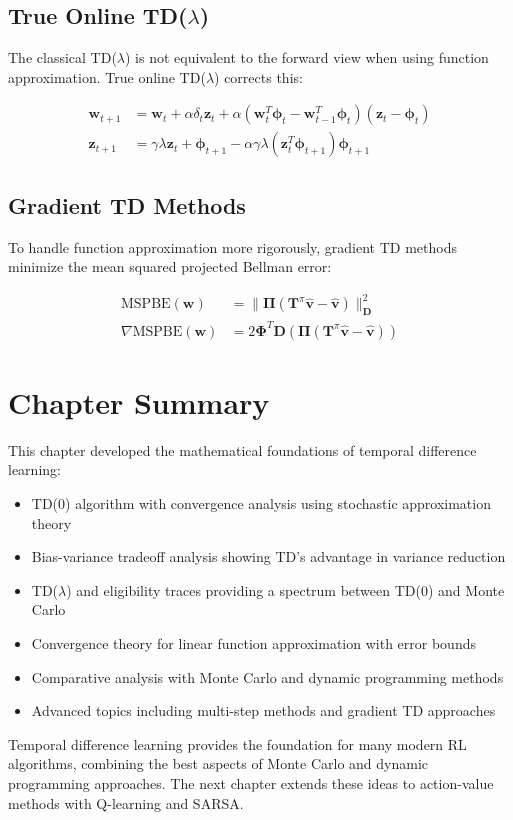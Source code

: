 \subsection{True Online TD($\lambda$)}

The classical TD($\lambda$) is not equivalent to the forward view when using function approximation. True online TD($\lambda$) corrects this:

\begin{align}
\mathbf{w}_{t+1} &= \mathbf{w}_t + \alpha \delta_t \mathbf{z}_t + \alpha(\mathbf{w}_t^T \boldsymbol{\phi}_t - \mathbf{w}_{t-1}^T \boldsymbol{\phi}_t)(\mathbf{z}_t - \boldsymbol{\phi}_t) \\
\mathbf{z}_{t+1} &= \gamma \lambda \mathbf{z}_t + \boldsymbol{\phi}_{t+1} - \alpha \gamma \lambda (\mathbf{z}_t^T \boldsymbol{\phi}_{t+1})\boldsymbol{\phi}_{t+1}
\end{align}

\subsection{Gradient TD Methods}

To handle function approximation more rigorously, gradient TD methods minimize the mean squared projected Bellman error:

\begin{align}
\text{MSPBE}(\mathbf{w}) &= \|\boldsymbol{\Pi}(\mathbf{T}^\pi \hat{\mathbf{v}} - \hat{\mathbf{v}})\|_{\mathbf{D}}^2 \\
\nabla \text{MSPBE}(\mathbf{w}) &= 2\boldsymbol{\Phi}^T \mathbf{D} (\boldsymbol{\Pi}(\mathbf{T}^\pi \hat{\mathbf{v}} - \hat{\mathbf{v}}))
\end{align}

\section{Chapter Summary}

This chapter developed the mathematical foundations of temporal difference learning:

\begin{itemize}
    \item TD(0) algorithm with convergence analysis using stochastic approximation theory
    \item Bias-variance tradeoff analysis showing TD's advantage in variance reduction
    \item TD($\lambda$) and eligibility traces providing a spectrum between TD(0) and Monte Carlo
    \item Convergence theory for linear function approximation with error bounds
    \item Comparative analysis with Monte Carlo and dynamic programming methods
    \item Advanced topics including multi-step methods and gradient TD approaches
\end{itemize}

Temporal difference learning provides the foundation for many modern RL algorithms, combining the best aspects of Monte Carlo and dynamic programming approaches. The next chapter extends these ideas to action-value methods with Q-learning and SARSA.